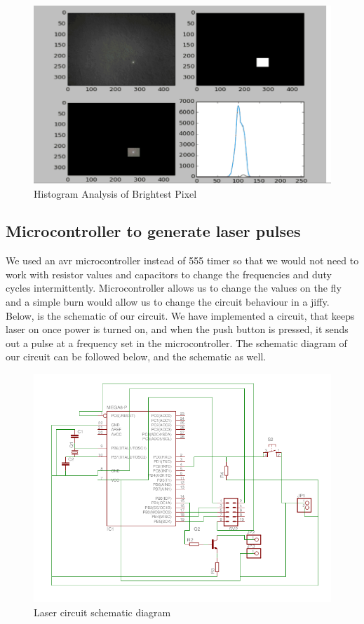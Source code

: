 \documentclass[12pt, a4paper]{article}
\begin{document}
\begin{figure}[htp]
	\centering
	\includegraphics[scale=0.20]{histogram.png}
	\caption{Histogram Analysis of Brightest Pixel}
	\label{}
\end{figure}
		
\subsection{Microcontroller to generate laser pulses}

	We used an avr microcontroller instead of 555 timer so that we would not need to work with resistor values and capacitors to change the frequencies and duty cycles intermittently. Microcontroller allows us to change the values on the fly and a simple burn would allow us to change the circuit behaviour in a jiffy. Below, is the schematic of our circuit. We have implemented a circuit, that keeps laser on once power is turned on, and when the push button is pressed, it sends out a pulse at a frequency set in the microcontroller. The schematic diagram of our circuit can be followed below, and the schematic as well.
	

\begin{figure}[htp]
	\centering
	\includegraphics[scale=0.55]{schematic.png}
	\caption{Laser circuit schematic diagram}
	\label{}
\end{figure}
\end{document}
